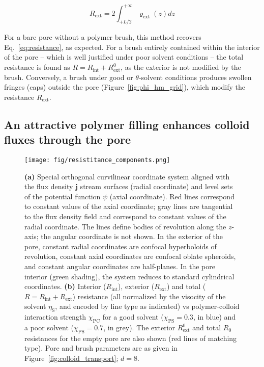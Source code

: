 \documentclass[12pt, a4paper]{article}
\begin{document}
\begin{equation}
   R_{\text{ext}} =2\int_{+L/2}^{+\infty}\varrho_{\text{ext}}(z)dz
    \label{R_ext}
\end{equation}

For a bare pore without a polymer brush, this method recovers Eq.~\ref{eq:resistance}, as expected.
For a brush entirely contained within the interior of the pore -- which is well justified under poor solvent conditions -- the total resistance is found as $R = R_{\text{int}} + R_{\text{ext}}^{0}$, as the exterior is not modified by the brush.
Conversely, a brush under good or $\theta$-solvent conditions produces swollen fringes (caps) outside the pore (Figure~\ref{fig:phi_hm_grid}), which modify the resistance $R_{\text{ext}}$.


\subsection{An attractive polymer filling enhances colloid fluxes through the pore}

\begin{figure}
    \centering
    \texttt{[image: fig/resistitance\_components.png]}
    \caption{
    \textbf{(a)} Special orthogonal curvilinear coordinate system aligned with the flux density $\bm{j}$ stream surfaces (radial coordinate) and level sets of the potential function $\psi$ (axial coordinate).
    Red lines correspond to constant values of the axial coordinate; gray lines are tangential to the flux density field and correspond to constant values of the radial coordinate.
    The lines define bodies of revolution along the $z$-axis; the angular coordinate is not shown.
    In the exterior of the pore, constant radial coordinates are confocal hyperboloids of revolution, constant axial coordinates are confocal oblate spheroids, and constant angular coordinates are half-planes.
    In the pore interior (green shading), the system reduces to standard cylindrical coordinates. 
    \textbf{(b)} Interior ($R_{\text{int}}$), exterior ($R_{\text{ext}}$) and total ($R = R_{\text{int}} + R_{\text{ext}}$) resistance (all normalized by the visocity of the solvent $\eta_\text{S}$, and encoded by line type as indicated) vs polymer-colloid interaction strength $\chi_{\text{PC}}$ for a good solvent ($\chi_{\text{PS}} = 0.3$, in blue) and a poor solvent ($\chi_{\text{PS}} = 0.7$, in grey).
    The exterior $R_{\text{ext}}^{0}$ and total $R_0$ resistances for the empty pore are also shown (red lines of matching type).  
    Pore and brush parameters are as given in Figure~\ref{fig:colloid_transport}; $d = 8$.
    }
    \label{fig:resistivity_profile}
\end{figure}
\end{document}
